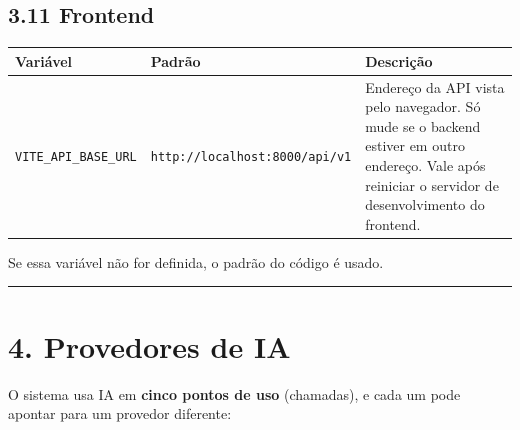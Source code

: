 \documentclass[
  brazilian,
  a4paper,12pt,oneside]{report}
\newcounter{none} %
\begin{document}
\section{3.11 Frontend}\label{frontend}

{\def\LTcaptype{none} %
\begin{longtable}[]{@{}
  >{\raggedright\arraybackslash}p{}
  >{\raggedright\arraybackslash}p{}
  >{\raggedright\arraybackslash}p{}@{}}
\toprule\noalign{}
\begin{minipage}[b]{\linewidth}\raggedright
Variável
\end{minipage} & \begin{minipage}[b]{\linewidth}\raggedright
Padrão
\end{minipage} & \begin{minipage}[b]{\linewidth}\raggedright
Descrição
\end{minipage} \\
\midrule\noalign{}
\endhead
\bottomrule\noalign{}
\endlastfoot
\texttt{VITE\_}\allowbreak{}\texttt{API\_}\allowbreak{}\texttt{BASE\_}\allowbreak{}\texttt{URL}
&
\texttt{http:}\allowbreak{}\texttt{/}\allowbreak{}\texttt{/}\allowbreak{}\texttt{localhost:}\allowbreak{}\texttt{8000/}\allowbreak{}\texttt{api/}\allowbreak{}\texttt{v1}
& Endereço da API vista pelo navegador. Só mude se o backend estiver em
outro endereço. Vale após reiniciar o servidor de desenvolvimento do
frontend. \\
\end{longtable}
}

Se essa variável não for definida, o padrão do código é usado.

\begin{center}\rule{0.5\linewidth}{0.5pt}\end{center}

\chapter{4. Provedores de IA}\label{provedores-de-ia}

O sistema usa IA em \textbf{cinco pontos de uso} (chamadas), e cada um
pode apontar para um provedor diferente:
\end{document}
